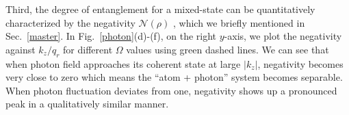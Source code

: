 \documentclass[atoms,article,submit,moreauthors,pdftex,12pt,a4paper]{mdpi}
\begin{document}
Third, the degree of entanglement for a mixed-state can be quantitatively characterized by the negativity $\mathcal{N}(\rho)$ \cite{negativity}, which we briefly mentioned in Sec.~\ref{master}. In Fig.~\ref{photon}(d)-(f), on the right $y$-axis, we plot the negativity against $k_z/q_r$ for different $\Omega$ values using green dashed lines. We can see that when photon field approaches its coherent state at large $|k_z|$, negativity becomes very close to zero which means the ``atom + photon'' system becomes separable. When photon fluctuation deviates from one, negativity shows up a pronounced peak in a qualitatively similar manner. 

\end{document}
